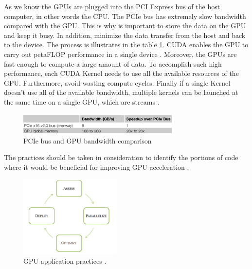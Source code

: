 As we know the GPUs are plugged into the PCI Express bus of the host computer, in other words the CPU. The PCIe bus has extremely slow bandwidth compared with the GPU. This is why is important to store the data on the GPU and keep it busy. In addition, minimize the data transfer from the host and back to the device. The process is illustrates in the table \ref{fig:PCI}. CUDA enables the GPU to carry out petaFLOP performance in a single device \cite{cook}. Moreover, the GPUs are fast enough to compute a large amount of data. To accomplish such high performance, each CUDA Kernel needs to use all the available resources of the GPU. Furthermore, avoid wasting compute cycles. Finally if a single Kernel doesn't use all of the available bandwidth, multiple kernels can be launched at the same time on a single GPU, which are streams \cite{design}.

\begin{figure}[htbp]
	\centering
		\includegraphics[width=0.72\textwidth]{Figures/PCI.png}
		\smallskip
	\caption[PCIe Bandwidth]{PCIe bus and GPU bandwidth comparison \cite{cook}}
	\label{fig:PCI}
\end{figure}

The practices should be taken in consideration to identify the portions of code where it would be beneficial for improving GPU acceleration \cite{practices}.

\begin{figure}[htbp]
	\centering
		\includegraphics[width=0.45\textwidth]{Figures/apod.png}
		\smallskip
	\caption[GPU application practices]{GPU application practices \cite{practices}.}
	\label{fig:apod}
\end{figure}

